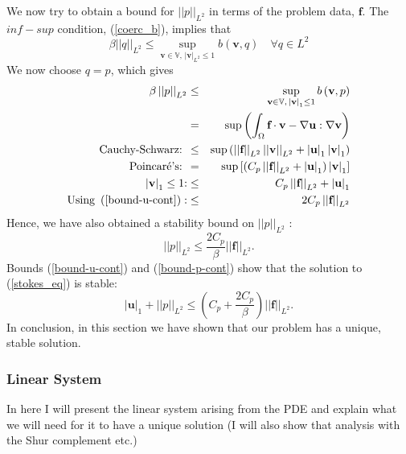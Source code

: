 \documentclass[12pt,a4paper]{article}
\theoremstyle{definition}
\begin{document}
We now try to obtain a bound for $\left|\left|p\right|\right|_{L^2}$ in terms of the problem data, $\textbf{f}$.  The $inf-sup$ condition, (\ref{coerc_b}), implies that
\begin{equation}\nonumber
\beta \left|\left|q\right|\right|_{L^2}\leq \sup_{\textbf{v}\in \mathbb{V}, \,\left|\textbf{v}\right|_{L^2}\leq1}  b\left(\textbf{v},q\right)\quad  \forall q \in L^2
\end{equation}
We now choose $q=p$, which gives 
\begin{eqnarray}\nonumber
\beta \left|\left|p\right|\right|_{L^2} &\leq& \sup_{\textbf{v}\in \mathbb{V}, \,\left|\textbf{v}\right|_1\leq1}  b\left(\textbf{v},p\right)\\\nonumber
&=& \sup \left(\int_{\Omega}\textbf{f}\cdot\textbf{v} -\nabla\textbf{u}:\nabla\textbf{v}\right)\\\nonumber
\text{Cauchy-Schwarz: }&\leq& \sup \left(\left|\left|\textbf{f}\right| \right|_{L^2} \left|\left|\textbf{v}\right|\right|_{L^2}+\left|\textbf{u}\right|_1 \left|\textbf{v}\right|_1\right)\\\nonumber
\text{Poincar\'e's: }&=&\sup \left[\left(C_p\left|\left|\textbf{f}\right| \right|_{L^2}+ \left|\textbf{u}\right|_1\right) \left|\textbf{v}\right|_1\right] \\\nonumber
\left|\textbf{v}\right|_1\leq 1\text{:} &\leq&C_p\left|\left|\textbf{f}\right| \right|_{L^2}+ \left|\textbf{u}\right|_1\\\nonumber
\text{Using }\left(\ref{bound-u-cont}\right):&\leq&2C_p\left|\left|\textbf{f}\right| \right|_{L^2}
\end{eqnarray}
Hence, we have also obtained a stability bound on $\left|\left|p\right|\right|_{L^2}$ :
\begin{equation}\label{bound-p-cont}
\left|\left|p\right|\right|_{L^2} \leq \frac{2C_p}{\beta}\left|\left|\textbf{f}\right|\right|_{L^2}.
\end{equation}
Bounds (\ref{bound-u-cont}) and (\ref{bound-p-cont}) show that the solution to (\ref{stokes_eq}) is stable:
\begin{equation}
\left|\textbf{u}\right|_1+\left|\left|p\right|\right|_{L^2} \leq\left( C_p+\frac{2C_p}{\beta}\right)\left|\left|\textbf{f}\right|\right|_{L^2}.
\end{equation}
In conclusion, in this section we have shown that our problem has a unique, stable solution.
\subsubsection{Linear System}
In here I will present the linear system arising from the PDE and explain what we will need for it to have a unique solution (I will also show that analysis with the Shur complement etc.)
\end{document}
